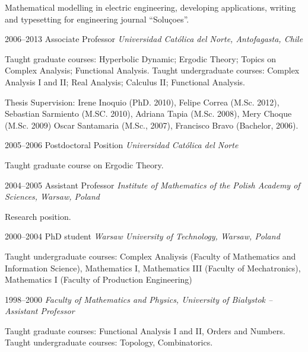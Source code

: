 \documentclass{article}
\begin{document}
\begin{CV}
  Mathematical modelling in electric engineering, developing
  applications,  writing and typesetting for engineering journal
  ``Soluçoes''.


\item[2006--2013] {Associate Professor \it Universidad Cat\'olica del Norte,
    Antofagasta, Chile}
  
  Taught graduate courses: Hyperbolic Dynamic; Ergodic Theory; Topics
  on Complex Analysis; Functional Analysis.  Taught undergraduate
  courses: Complex Analysis I and II; Real Analysis; Calculus II;
  Functional Analysis.
  
  Thesis Supervision: Irene Inoquio (PhD. 2010), Felipe Correa
  (M.Sc. 2012), Sebastian Sarmiento (M.SC. 2010), Adriana Tapia
  (M.Sc. 2008), Mery Choque (M.Sc. 2009) Oscar Santamaria (M.Sc.,
  2007), Francisco Bravo (Bachelor, 2006).
\item[2005--2006] {Postdoctoral Position \it Universidad Cat\'olica del Norte}

  Taught graduate course on Ergodic Theory.
\item[2004--2005] {Assistant Professor \em Institute of Mathematics of the Polish Academy of
    Sciences, Warsaw, Poland}

  Research position.
\item[2000--2004] {PhD student \it Warsaw University of Technology, Warsaw, Poland}

  Taught undergraduate courses: Complex Analiysis (Faculty of
  Mathematics and Information Science), Mathematics I, Mathematics III
  (Faculty of Mechatronics), Mathematics I (Faculty of Production Engineering)
\item[1998--2000] {\em Faculty of Mathematics and Physics, University
    of Bia{\l}ystok -- Assistant Professor}

  Taught graduate courses: Functional Analysis I and II, Orders and
  Numbers.  Taught undergraduate courses: Topology, Combinatorics.
\end{CV}
\end{document}
